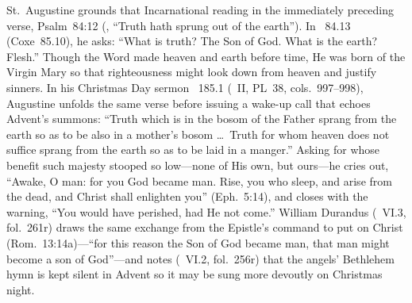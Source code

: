 St.~Augustine grounds that Incarnational reading in the immediately preceding verse, Psalm~84:12 (, ``Truth hath sprung out of the earth''). In ~84.13 (Coxe~85.10), he asks: ``What is truth? The Son of God. What is the earth? Flesh.'' Though the Word made heaven and earth before time, He was born of the Virgin Mary so that righteousness might look down from heaven and justify sinners. In his Christmas Day sermon ~185.1 (~II, PL~38, cols.~997--998), Augustine unfolds the same verse before issuing a wake-up call that echoes Advent's summons: ``Truth which is in the bosom of the Father sprang from the earth so as to be also in a mother's bosom \dots\ Truth for whom heaven does not suffice sprang from the earth so as to be laid in a manger.'' Asking for whose benefit such majesty stooped so low---none of His own, but ours---he cries out, ``Awake, O man: for you God became man. Rise, you who sleep, and arise from the dead, and Christ shall enlighten you'' (Eph.~5:14), and closes with the warning, ``You would have perished, had He not come.'' William Durandus (~VI.3, fol.~261r) draws the same exchange from the Epistle's command to put on Christ (Rom.~13:14a)---``for this reason the Son of God became man, that man might become a son of God''---and notes (~VI.2, fol.~256r) that the angels' Bethlehem hymn  is kept silent in Advent so it may be sung more devoutly on Christmas night.

